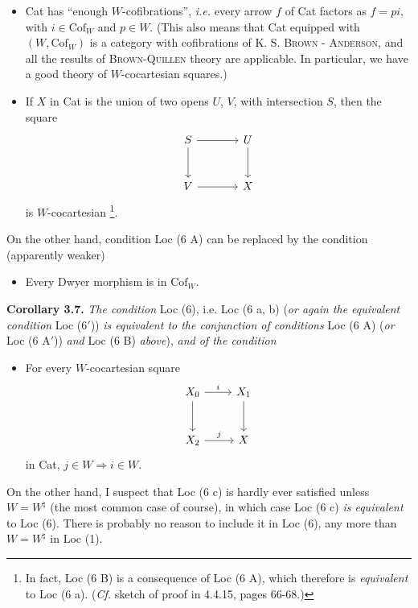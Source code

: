 \documentclass[11pt]{article}
\newcommand{\printedpage}[1]{\marginpar{\footnotesize p.~#1}}
\newcommand{\msp}[1]{\marginpar{\footnotesize [#1]}}
\newcommand{\Cof}{\mathrm{Cof}}
\begin{document}
\printedpage{18}
\begin{itemize}[leftmargin=7em, labelwidth=6em]
\item[\textbf{Loc (6 A)}] Cat has ``enough $W$-cofibrations'',
\msp{page 26}\textit{i.e.} every arrow $f$ of Cat factors as $f = pi$, with $i \in \Cof_W$ and $p \in W$. (This also means that Cat equipped with $(W, \Cof_W)$ is a category with cofibrations of K. S. \textsc{Brown} - \textsc{Anderson}, and all the results of \textsc{Brown-Quillen} theory are applicable. In particular, we have a good theory of $W$-cocartesian squares.)
\item[\textbf{Loc (6 B)}] If $X$ in Cat is the union of two opens $U$, $V$, with intersection $S$, then the square
\[
\begin{tikzcd}[ampersand replacement=\&, row sep=large, column sep=large]
S \arrow[r] \arrow[d] \& U \arrow[d] \\
V \arrow[r] \& X
\end{tikzcd}
\]
is $W$-cocartesian \footnote[19]{In fact, Loc (6 B) is a consequence of Loc (6 A), which therefore is \textit{equivalent} to Loc (6 a). (\textit{Cf.} sketch of proof in 4.4.15, pages 66-68.)}.
\end{itemize}
On the other hand, condition Loc (6 A) can be replaced by the condition (apparently weaker)
\begin{itemize}[leftmargin=7em, labelwidth=6em]
\item[\textbf{Loc (6 A$'$)}] Every Dwyer morphism is in $\Cof_W$.
\end{itemize}
\textbf{Corollary 3.7.} \textit{The condition} Loc (6), i.e. Loc (6 a, b) (\textit{or again the equivalent condition} Loc (6$'$)) \textit{is equivalent to the conjunction of conditions} Loc (6 A) (\textit{or} Loc (6 A$'$)) \textit{and} Loc (6 B) \textit{above}), \textit{and of the condition}
\begin{itemize}[leftmargin=7em, labelwidth=6em]
\item[\textbf{Loc (6 C)}] For every $W$-cocartesian square
\[
\begin{tikzcd}[ampersand replacement=\&, row sep=large]
X_0 \arrow[r, "i"] \arrow[d] \& X_1 \arrow[d] \\
X_2 \arrow[r, "j"] \& X
\end{tikzcd}
\]
in Cat, $j \in W \Longrightarrow i \in W$.
\end{itemize}
\msp{page 27}On the other hand, I suspect that Loc (6 c) is hardly ever satisfied unless $W = W^{\natural}$ (the most common case of course), in which case Loc (6 c) \textit{is equivalent} to Loc (6). There is probably no reason to include it in Loc (6), any more than $W = W^{\natural}$ in Loc (1).
\end{document}
